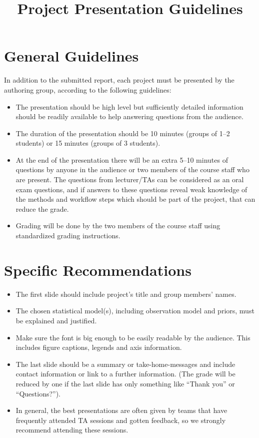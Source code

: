 \documentclass[11pt,a4paper]{article}
\title{Project Presentation Guidelines}
\author{}
\date{}
\begin{document}
\maketitle

\section{General Guidelines}

In addition to the submitted report, each project must be presented by the authoring group, according to the following guidelines:

\begin{itemize}
    \item The presentation should be high level but sufficiently detailed information should be readily available to help answering questions from the audience.
    \item The duration of the presentation should be 10 minutes (groups of 1--2 students) or 15 minutes (groups of 3 students).
    \item At the end of the presentation there will be an extra 5--10 minutes of questions by anyone in the audience or two members of the course staff who are present. The questions from lecturer/TAs can be considered as an oral exam questions, and if answers to these questions reveal weak knowledge of the methods and workflow steps which should be part of the project, that can reduce the grade.
    \item Grading will be done by the two members of the course staff using standardized grading instructions.
\end{itemize}

\section{Specific Recommendations}

\begin{itemize}
    \item The first slide should include project's title and group members' names.
    \item The chosen statistical model(s), including observation model and priors, must be explained and justified.
    \item Make sure the font is big enough to be easily readable by the audience. This includes figure captions, legends and axis information.
    \item The last slide should be a summary or take-home-messages and include contact information or link to a further information. (The grade will be reduced by one if the last slide has only something like ``Thank you'' or ``Questions?'').
    \item In general, the best presentations are often given by teams that have frequently attended TA sessions and gotten feedback, so we strongly recommend attending these sessions.
\end{itemize}
\end{document}
